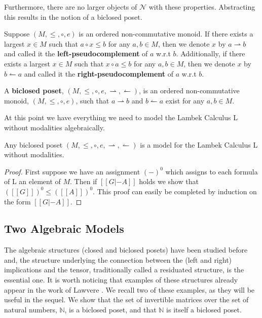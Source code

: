 \documentclass{lmcs}
\newcommand{\N}{\mathcal{N}}
\newcommand{\rto}{\leftharpoonup}
\newcommand{\lto}{\rightharpoonup}
\begin{document}
Furthermore, there are no larger objects of $\N$ with these
properties.  Abstracting this results in the notion of a biclosed
poset.
\begin{defi}
  \label{def:biclosed-poset}
  Suppose $(M, \leq, \circ, e)$ is an ordered non-commutative monoid.
  If there exists a largest $x \in M$ such that $a \circ x \leq b$ for
  any $a, b \in M$, then we denote $x$ by $a \lto b$ and called it
  the \textbf{left-pseudocomplement} of $a$ w.r.t $b$.  Additionally,
  if there exists a largest $x \in M$ such that $x \circ a \leq b$ for
  any $a, b \in M$, then we denote $x$ by $b \rto a$ and called it
  the \textbf{right-pseudocomplement} of $a$ w.r.t $b$.

  A \textbf{biclosed poset}, $(M, \leq, \circ, e, \lto, \rto)$, is an  ordered non-commutative monoid, $(M, \leq, \circ, e)$, such that $a
  \lto b$ and $b \rto a$ exist for any $a,b \in M$.
\end{defi}

At this point we have everything we need to model the Lambek Calculus L without modalities algebraically.
\begin{lem}
  \label{lemma:biclosed-poset-model-L}
  Any biclosed poset $(M, \leq, \circ, e, \lto, \rto)$ is a model for  the Lambek Calculus L without modalities.
\end{lem}
\begin{proof}
  First suppose we have an assignment $(-)^0$ which assigns to each
  formula of L an element of $M$.  Then if $[[G |- A]]$ holds we
  show that $([[G]])^0 \leq ([[A]])^0$.  This proof can easily be
  completed by induction on the form $[[G |- A]]$.  
\end{proof}

\subsection{Two  Algebraic Models}
\label{subsec:two_example_algebraic_models}

The algebraic structures (closed and biclosed posets) have been studied before and, the structure underlying the
connection between the (left and right) implications and the tensor, traditionally  called a residuated structure, is the essential one. It is worth noticing that  examples of these structures already appear in the work of Lawvere \cite{lawvere1973}. We recall two of these  examples, as they will be useful in the sequel.  
We show that the set of invertible matrices over the set of
natural numbers, $\mathbb{N}$, is a biclosed poset, and that $\mathbb{N}$ is itself a biclosed poset.
\vspace{-10px}
\end{document}
